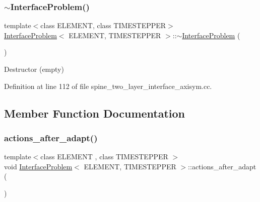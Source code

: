 \mbox{\label{classInterfaceProblem_a90c191f8046069099b199743e7ce7111}} 
\subsubsection{\texorpdfstring{$\sim$\+Interface\+Problem()}{~InterfaceProblem()}\hspace{0.1cm}{\footnotesize\ttfamily [2/2]}}
{\footnotesize\ttfamily template$<$class E\+L\+E\+M\+E\+NT, class T\+I\+M\+E\+S\+T\+E\+P\+P\+ER$>$ \\
\hyperlink{classInterfaceProblem}{Interface\+Problem}$<$ E\+L\+E\+M\+E\+NT, T\+I\+M\+E\+S\+T\+E\+P\+P\+ER $>$\+::$\sim$\hyperlink{classInterfaceProblem}{Interface\+Problem} (\begin{DoxyParamCaption}{ }\end{DoxyParamCaption})\hspace{0.3cm}{\ttfamily [inline]}}



Destructor (empty) 



Definition at line 112 of file spine\+\_\+two\+\_\+layer\+\_\+interface\+\_\+axisym.\+cc.



\subsection{Member Function Documentation}
\mbox{\label{classInterfaceProblem_a1c8a5dee970dccc3f1da993cf531872d}} 
\subsubsection{\texorpdfstring{actions\+\_\+after\+\_\+adapt()}{actions\_after\_adapt()}}
{\footnotesize\ttfamily template$<$class E\+L\+E\+M\+E\+NT , class T\+I\+M\+E\+S\+T\+E\+P\+P\+ER $>$ \\
void \hyperlink{classInterfaceProblem}{Interface\+Problem}$<$ E\+L\+E\+M\+E\+NT, T\+I\+M\+E\+S\+T\+E\+P\+P\+ER $>$\+::actions\+\_\+after\+\_\+adapt (\begin{DoxyParamCaption}{ }\end{DoxyParamCaption})\hspace{0.3cm}{\ttfamily [private]}}



